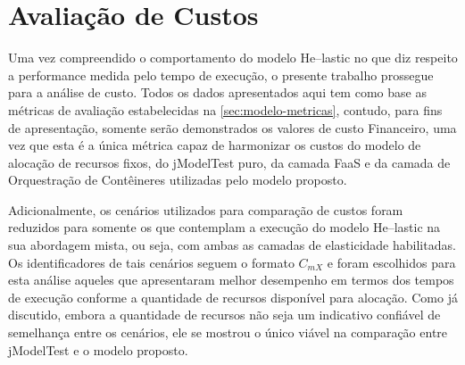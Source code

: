 \documentclass[english,brazilian]{UNISINOSmonografia} %
\begin{document}








\section{Avaliação de Custos}



Uma vez compreendido o comportamento do modelo \textsf{He}--lastic no que diz respeito a performance medida pelo tempo de execução, o presente trabalho prossegue para a análise de custo.
%
Todos os dados apresentados aqui tem como base as métricas de avaliação estabelecidas na \autoref{sec:modelo-metricas}, contudo, para fins de apresentação, somente serão demonstrados os valores de custo Financeiro, uma vez que esta é a única métrica capaz de harmonizar os custos do modelo de alocação de recursos fixos, do jModelTest puro, da camada FaaS e da camada de Orquestração de Contêineres utilizadas pelo modelo proposto.



Adicionalmente, os cenários utilizados para comparação de custos foram reduzidos para somente os que contemplam a execução do modelo \textsf{He}--lastic na sua abordagem mista, ou seja, com ambas as camadas de elasticidade habilitadas.
%
Os identificadores de tais cenários seguem o formato $C_{mX}$ e foram escolhidos para esta análise aqueles que apresentaram melhor desempenho em termos dos tempos de execução conforme a quantidade de recursos disponível para alocação.
%
Como já discutido, embora a quantidade de recursos não seja um indicativo confiável de semelhança entre os cenários, ele se mostrou o único viável na comparação entre jModelTest e o modelo proposto.
\end{document}
